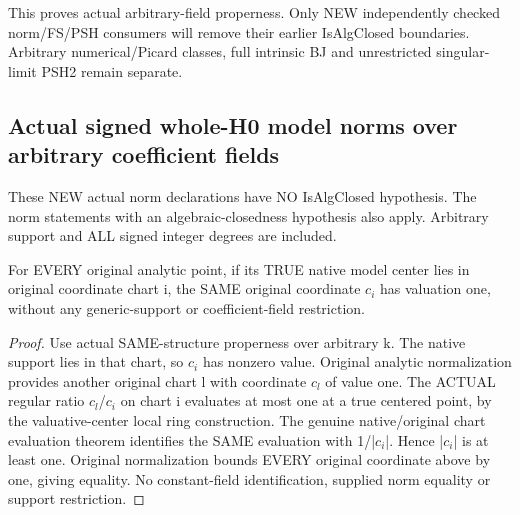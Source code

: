 This proves actual arbitrary-field properness. Only NEW independently
checked norm/FS/PSH consumers will remove their earlier IsAlgClosed
boundaries. Arbitrary numerical/Picard classes, full intrinsic BJ and
unrestricted singular-limit PSH2 remain separate.

\subsection{Actual signed whole-H0 model norms over arbitrary coefficient fields}
These NEW actual norm declarations have NO IsAlgClosed hypothesis. The
norm statements with an algebraic-closedness hypothesis also apply. Arbitrary
support and ALL signed integer degrees are included.

\begin{theorem}
\label{thm:seven-native-center-coordinate-one-arbitrary-field}
\leanok
For EVERY original analytic point, if its TRUE native model center lies
in original coordinate chart i, the SAME original coordinate $c_i$ has
valuation one, without any generic-support or coefficient-field restriction.
\end{theorem}
\begin{proof}
Use actual SAME-structure properness over arbitrary k. The native support
lies in that chart, so $c_i$ has nonzero value. Original analytic normalization
provides another original chart l with coordinate $c_l$ of value one.
The ACTUAL regular ratio $c_l$/$c_i$ on chart i evaluates at most one at a
true centered point, by the valuative-center local ring construction.
The genuine native/original chart evaluation theorem identifies the SAME
evaluation with 1/|$c_i$|. Hence |$c_i$| is at least one. Original normalization
bounds EVERY original coordinate above by one, giving equality. No
constant-field identification, supplied norm equality or support restriction.
\end{proof}

